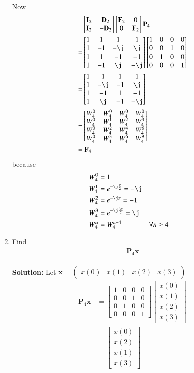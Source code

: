 \documentclass[journal,12pt,twocolumn]{IEEEtran}
\newcommand{\myvec}[1]{\ensuremath{\begin{pmatrix}#1\end{pmatrix}}}
\newcommand{\solution}{\noindent \textbf{Solution: }}
\let\vec\mathbf
\numberwithin{equation}{section}
\renewcommand\thesection{\arabic{section}}
\newcommand{\myvec}[1]{\ensuremath{\begin{pmatrix}#1\end{pmatrix}}}
\newcommand{\mymat}[1]{\ensuremath{\begin{bmatrix}#1\end{bmatrix}}}
\renewcommand\thesection{\arabic{section}}
\begin{document}
\begin{enumerate}[label=\arabic*.,ref=\thesection.\theenumi]
	Now
	\begin{align}
		&\mymat{\vec{I}_2 & \vec{D}_2 \\ \vec{I}_2 & -\vec{D}_2} \mymat{\vec{F}_2 & 0 \\ 0 & \vec{F}_2} \vec{P}_4 \\
		= &\mymat{1 & 1 & 1 & 1 \\ 1 & -1 & -\j & \j \\ 1 & 1 & -1 & -1 \\ 1 & -1 & \j & -\j} \mymat{1 & 0 & 0 & 0 \\ 0 & 0 & 1 & 0 \\ 0 & 1 & 0 & 0 \\ 0 & 0 & 0 & 1} \\
		= &\mymat{1 & 1 & 1 & 1 \\ 1 & -\j & -1 & \j \\ 1 & -1 & 1 & -1 \\ 1 & \j & -1 & -\j} \\
		= &\mymat{W_4^0 & W_4^0 & W_4^0 & W_4^0 \\ W_4^0 & W_4^1 & W_4^2 & W_4^3 \\ W_4^0 & W_4^2 & W_4^4 & W_4^6 \\ W_4^0 & W_4^3 & W_4^6 & W_4^9} \\
		= &~\vec{F}_4
	\end{align}
	because
	\begin{align}
		W_4^0 &= 1 \\
		W_4^1 &= e^{-\j\frac{\pi}{2}} = -\j \\
		W_4^2 &= e^{-\j\pi} = -1 \\
		W_4^3 &= e^{-\j\frac{3\pi}{2}} = \j \\
		W_4^n &= W_4^{n - 4} &&\forall n \ge 4
	\end{align}	 		

	\item Find 
    \begin{align}
	     \vec{P}_4 \vec{x}
    \end{align}
    
    \solution Let $\vec{x} = \myvec{x(0) & x(1) & x(2) & x(3)}^\top$
    \begin{align}
		\vec{P}_4 \vec{x} &= \mymat{1 & 0 & 0 & 0 \\ 0 & 0 & 1 & 0 \\ 0 & 1 & 0 & 0 \\ 0 & 0 & 0 & 1} \mymat{x(0) \\ x(1) \\ x(2) \\ x(3)} \\
		&= \mymat{x(0) \\ x(2) \\ x(1) \\ x(3)}
    \end{align}


\end{enumerate}
\end{document}
